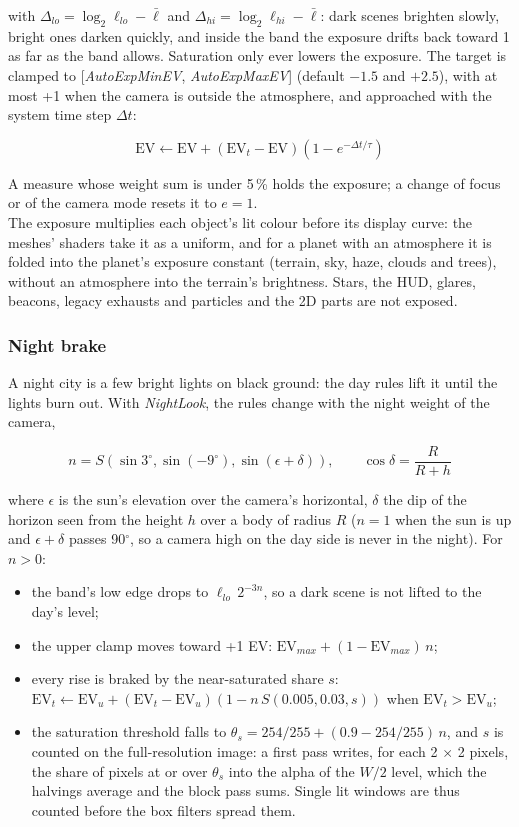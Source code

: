 \documentclass[Orbiter Technical Reference.tex]{subfiles}
\begin{document}
\begin{sloppypar}
\noindent
with $\Delta_{lo} = \log_{2}\ell_{lo} - \bar{\ell}$ and $\Delta_{hi} = \log_{2}\ell_{hi} - \bar{\ell}$: dark scenes brighten slowly, bright ones darken quickly, and inside the band the exposure drifts back toward 1 as far as the band allows. Saturation only ever lowers the exposure. The target is clamped to [\textit{AutoExpMinEV}, \textit{AutoExpMaxEV}] (default $-1.5$ and $+2.5$), with at most +1 when the camera is outside the atmosphere, and approached with the system time step $\Delta t$:

\[ \mathrm{EV} \leftarrow \mathrm{EV} + (\mathrm{EV}_{t} - \mathrm{EV})\left(1 - e^{-\Delta t/\tau}\right) \]

\noindent
A measure whose weight sum is under 5\,\% holds the exposure; a change of focus or of the camera mode resets it to $e = 1$.\\
The exposure multiplies each object's lit colour before its display curve: the meshes' shaders take it as a uniform, and for a planet with an atmosphere it is folded into the planet's exposure constant (terrain, sky, haze, clouds and trees), without an atmosphere into the terrain's brightness. Stars, the HUD, glares, beacons, legacy exhausts and particles and the 2D parts are not exposed.


\subsubsection{Night brake}\label{sec:vk_nightexpo}
A night city is a few bright lights on black ground: the day rules lift it until the lights burn out. With \textit{NightLook}, the rules change with the night weight of the camera,

\[ n = S\left(\sin 3^{\circ}, \sin(-9^{\circ}), \sin(\epsilon + \delta)\right), \qquad \cos\delta = \frac{R}{R+h} \]

\noindent
where $\epsilon$ is the sun's elevation over the camera's horizontal, $\delta$ the dip of the horizon seen from the height $h$ over a body of radius $R$ ($n = 1$ when the sun is up and $\epsilon + \delta$ passes 90$^{\circ}$, so a camera high on the day side is never in the night). For $n > 0$:

\begin{itemize}
\item the band's low edge drops to $\ell_{lo}\,2^{-3n}$, so a dark scene is not lifted to the day's level;
\item the upper clamp moves toward +1 EV: $\mathrm{EV}_{max} + (1 - \mathrm{EV}_{max})\,n$;
\item every rise is braked by the near-saturated share $s$: $\mathrm{EV}_{t} \leftarrow \mathrm{EV}_{u} + (\mathrm{EV}_{t} - \mathrm{EV}_{u})(1 - n\,S(0.005, 0.03, s))$ when $\mathrm{EV}_{t} > \mathrm{EV}_{u}$;
\item the saturation threshold falls to $\theta_{s} = 254/255 + (0.9 - 254/255)\,n$, and $s$ is counted on the full-resolution image: a first pass writes, for each 2 $\times$ 2 pixels, the share of pixels at or over $\theta_{s}$ into the alpha of the $W/2$ level, which the halvings average and the block pass sums. Single lit windows are thus counted before the box filters spread them.
\end{itemize}


\end{sloppypar}
\end{document}
